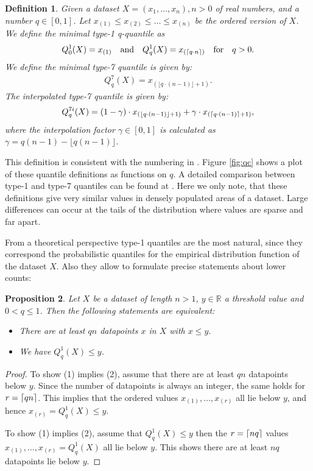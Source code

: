 \documentclass{article}
\DeclarePairedDelimiter{\ceil}{\lceil}{\rceil}
\theoremstyle{plain}
\newtheorem{definition}{Definition}[section]
\newtheorem{proposition}[definition]{Proposition}
\theoremstyle{remark}
\newcommand{\IR}{\mathbb{R}}
\newcommand{\qtext}[1]{\quad\text{#1}\quad} %
\newcommand{\floor}[1]{\lfloor#1\rfloor}
\begin{document}
\begin{definition} \label{def:quantiles}
  Given a dataset $X=(x_1,\dots,x_n), n>0$ of real numbers, and a number $q \in [0,1]$.
  Let $x_{(1)} \leq x_{(2)} \leq \dots \leq x_{(n)}$ be the ordered version of $X$.
  We define the minimal type-1 q-quantile as
  \begin{align*}
    Q^1_0(X) = x_{(1)} \qtext{and}  Q^1_q(X) = x_{(\ceil{q \cdot n})} \qtext{for} q > 0.
  \end{align*}
  We define the minimal type-7 quantile is given by:
  \begin{align*}
    Q^{7}_q(X) = x_{(\floor{q \cdot (n - 1)} + 1)}.
  \end{align*}
  The interpolated type-7 quantile is given by:
  \begin{align*}
    Q^{7i}_q(X) = (1 - \gamma) \cdot x_{(\floor{q \cdot (n - 1)} + 1)} + \gamma \cdot x_{(\ceil{q \cdot (n - 1)} + 1)},
  \end{align*}
  where the interpolation factor $\gamma \in [0,1]$ is calculated as $\gamma = q(n-1) - \floor{q(n-1)}$.
\end{definition}

This definition is consistent with the numbering in \cite{HF1996}.
Figure \ref{fig:qc} shows a plot of these quantile definitions as functions on $q$.
A detailed comparison between type-1 and type-7 quantiles can be found at \cite{HH19}.
Here we only note, that these definitions give very similar values in densely populated areas of a dataset.
Large differences can occur at the tails of the distribution where values are sparse and far apart.

From a theoretical perspective type-1 quantiles are the most natural, since they correspond the
probabilistic quantiles for the empirical distribution function of the dataset $X$.
Also they allow to formulate precise statements about lower counts:

\begin{proposition}
  Let $X$ be a dataset of length $n > 1$, $y \in \IR$ a threshold value and $0 < q \leq 1$.
  Then the following statements are equivalent:
  \begin{itemize}
  \item[(1)] There are at least $q n$ datapoints $x$ in $X$ with $x \leq y$.
  \item[(2)] We have $Q^1_q(X) \leq y$.
  \end{itemize}
\end{proposition}

\begin{proof}
  To show (1) implies (2), assume that there are at least $q n$ datapoints below $y$.
  Since the number of datapoints is always an integer, the same holds for $r = \ceil{q n}$.
  This implies that the ordered values $x_{(1)}, \dots, x_{(r)}$ all lie below $y$,
  and hence $x_{(r)} = Q^1_q(X) \leq y$.

  To show (1) implies (2), assume that $Q^1_q(X) \leq y$ then the $r = \ceil{n q}$ values $x_{(1)},
  \dots, x_{(r)} = Q^1_q(X)$ all lie below $y$. This shows there are at least $n q$
  datapoints lie below $y$.
\end{proof}
\end{document}
